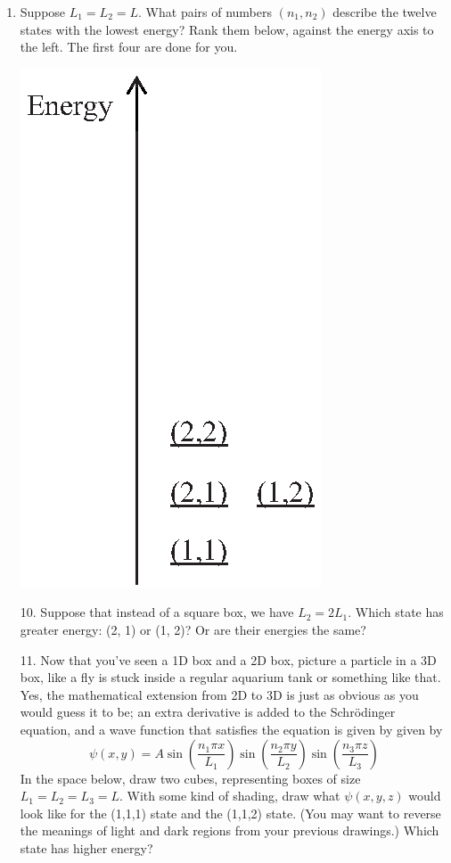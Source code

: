 \begin{enumerate}[wide]
\item Suppose $L_1=L_2=L$.   What pairs of numbers $(n_1,n_2)$ describe the twelve states with the lowest energy?  Rank them below, against the energy axis to the left.  The first four are done for you.
\begin{center}
\includegraphics[scale=0.8]{particle_in_2d_box/2d_box_energies.eps}
\end{center}

10.  Suppose that instead of a square box, we have $L_2=2L_1$.  Which state has greater energy: (2, 1) or (1, 2)?  Or are their energies the same?
\answerspace{0.6in}

11.  Now that you've seen a 1D box and a 2D box, picture a particle in a 3D box, like a fly is stuck inside a regular aquarium tank or something like that.  Yes, the mathematical extension from 2D to 3D is just as obvious as you would guess it to be; an extra derivative is added to the Schrödinger equation, and a wave function that satisfies the equation is given by given by
$$\displaystyle\psi(x,y)=A\sin\left(\frac{n_1\pi x}{L_1}\right)\sin\left(\frac{n_2\pi y}{L_2}\right)\sin\left(\frac{n_3\pi z}{L_3}\right)$$
In the space below, draw two cubes, representing boxes of size $L_1=L_2=L_3=L$.  With some kind of shading, draw what $\psi(x,y,z)$ would look like for the (1,1,1) state and the (1,1,2) state.  (You may want to reverse the meanings of light and dark regions from your previous drawings.) Which state has higher energy?
\answerspace{1.6in}

\end{enumerate}
